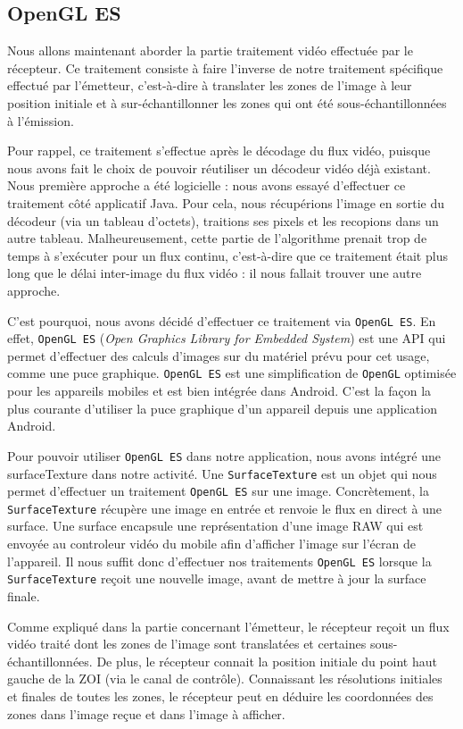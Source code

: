\documentclass[11pt,a4paper]{article}
\begin{document}
\subsection{OpenGL ES}
Nous allons maintenant aborder la partie traitement vidéo effectuée par le récepteur.
Ce traitement consiste à faire l'inverse de notre traitement spécifique effectué par l'émetteur, c'est-à-dire à translater les zones de l'image à leur position initiale et à sur-échantillonner les zones qui ont été sous-échantillonnées à l'émission.

\bigbreak
Pour rappel, ce traitement s'effectue après le décodage du flux vidéo, puisque nous avons fait le choix de pouvoir réutiliser un décodeur vidéo déjà existant.
Nous première approche a été logicielle : nous avons essayé d'effectuer ce traitement côté applicatif Java.
Pour cela, nous récupérions l'image en sortie du décodeur (via un tableau d'octets), traitions ses pixels et les recopions dans un autre tableau.
Malheureusement, cette partie de l'algorithme prenait trop de temps à s'exécuter pour un flux continu, c'est-à-dire que ce traitement était plus long que le délai inter-image du flux vidéo : il nous fallait trouver une autre approche.

\bigbreak
C'est pourquoi, nous avons décidé d'effectuer ce traitement via \texttt{OpenGL ES}.
En effet, \texttt{OpenGL ES} (\textit{Open Graphics Library for Embedded System}) est une API qui permet d'effectuer des calculs d'images sur du matériel prévu pour cet usage, comme une puce graphique. 
\texttt{OpenGL ES} est une simplification de \texttt{OpenGL} optimisée pour les appareils mobiles et est bien intégrée dans Android.
C'est la façon la plus courante d'utiliser la puce graphique d'un appareil depuis une application Android.

\bigbreak
Pour pouvoir utiliser \texttt{OpenGL ES} dans notre application, nous avons intégré une surfaceTexture dans notre activité.
Une \texttt{SurfaceTexture} est un objet qui nous permet d'effectuer un traitement \texttt{OpenGL ES} sur une image.
Concrètement, la \texttt{SurfaceTexture} récupère une image en entrée et renvoie le flux en direct à une surface.
Une surface encapsule une représentation d'une image RAW qui est envoyée au controleur vidéo du mobile afin d'afficher l'image sur l'écran de l'appareil.
Il nous suffit donc d'effectuer nos traitements \texttt{OpenGL ES} lorsque la \texttt{SurfaceTexture} reçoit une nouvelle image, avant de mettre à jour la surface finale.

\bigbreak
Comme expliqué dans la partie concernant l'émetteur, le récepteur reçoit un flux vidéo traité dont les zones de l'image sont translatées et certaines sous-échantillonnées.
De plus, le récepteur connait la position initiale du point haut gauche de la ZOI (via le canal de contrôle).
Connaissant les résolutions initiales et finales de toutes les zones, le récepteur peut en déduire les coordonnées des zones dans l'image reçue et dans l'image à afficher.
\end{document}
